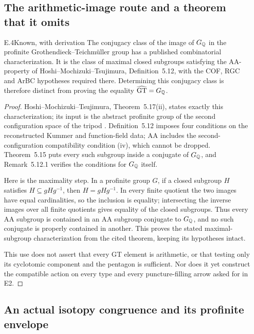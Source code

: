 \subsection{The arithmetic-image route and a theorem that it omits}

\begin{claim}{E.4}{Known, with derivation}
The conjugacy class of the image of $G_\mathbb Q$ in the profinite
Grothendieck--Teichm\"uller group has a published combinatorial
characterization. It is the class of maximal closed subgroups
satisfying the AA-property of Hoshi--Mochizuki--Tsujimura,
Definition~5.12, with the COF, RGC and ArBC hypotheses required
there. Determining this conjugacy class is therefore distinct
from proving the equality $\widehat{\mathrm{GT}}=G_\mathbb Q$.
\end{claim}
\begin{proof}
Hoshi--Mochizuki--Tsujimura, Theorem~5.17(ii), states exactly this
characterization; its input is the abstract profinite group of
the second configuration space of the tripod
\citep{E_HMT2025}. Definition~5.12 imposes four conditions on
the reconstructed Kummer and function-field data; AA includes
the second-configuration compatibility condition (iv), which
cannot be dropped. Theorem~5.15 puts every such subgroup inside
a conjugate of $G_\mathbb Q$, and Remark~5.12.1 verifies the conditions
for $G_\mathbb Q$ itself.

Here is the maximality step. In a profinite group $G$, if a closed
subgroup $H$ satisfies $H\subseteq gHg^{-1}$, then $H=gHg^{-1}$.
In every finite quotient the two images have equal cardinalities,
so the inclusion is equality; intersecting the inverse images over
all finite quotients gives equality of the closed subgroups.
Thus every AA subgroup is contained in an AA subgroup conjugate
to $G_\mathbb Q$, and no such conjugate is properly contained in another.
This proves the stated maximal-subgroup characterization from
the cited theorem, keeping its hypotheses intact.

This use does not assert that every GT element is arithmetic, or
that testing only its cyclotomic component and the pentagon is
sufficient. Nor does it yet construct the compatible action on
every type and every puncture-filling arrow asked for in E2.
\end{proof}

\subsection{An actual isotopy congruence and its profinite envelope}

